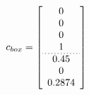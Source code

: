 \begin{equation*}
  \label{eq:box_pose}
  \centering
  c_{box}=\left[
    \begin{array}{c}
      0 \\
      0 \\
      0 \\
      1 \\ \hdashline[1pt/2pt]
      0.45 \\
      0 \\
      0.2874 
    \end{array}
\right]
\end{equation*}
